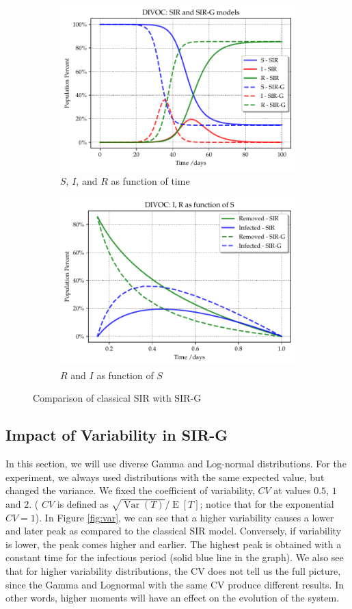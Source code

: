 \documentclass[USenglish,10pt]{article}
\DeclareMathOperator{\Exp}{E}       %
\newcommand{\E}[1]{\Exp\left[{#1}\right]}       %
\DeclareMathOperator{\Var}{Var}   %
\begin{document}
\begin{figure}
	\centering
	\begin{subfigure}{.45\textwidth}
		\includegraphics[width=.8\linewidth]{DIVOC-SIR-comp.pdf}
		\caption{$S$, $I$, and $R$ as function of time}
	\end{subfigure}
	\begin{subfigure}{.45\textwidth}
		\includegraphics[width=.8\linewidth]{DIVOC-IR-comp.pdf}
		\caption{$R$ and $I$ as function of $S$}
	\end{subfigure}
	\caption{Comparison of classical SIR with SIR-G}
	\label{fig:comp}
\end{figure}


\subsection{Impact of Variability in SIR-G}

In this section, we will use diverse Gamma and Log-normal distributions. For the experiment, we always used distributions with the same expected value, but changed the variance.
We fixed the coefficient of variability, $CV$ at values $0.5$, $1$ and $2$. ( $CV$ is defined as $\sqrt{\Var{(T)}}/\E{T}$; notice that for the exponential $CV=1$).
In Figure \ref{fig:var}, we can see that a higher variability causes a lower and later peak as compared to the classical SIR model.
Conversely, if variability is lower, the peak comes higher and earlier. The highest peak is obtained with a constant time for the infectious period (solid blue line in the graph).
We also see that for higher variability distributions, the CV does not tell us the full picture, since the Gamma and Lognormal with the same CV produce different results. In other words, higher moments will have an effect on the evolution of the system.
\end{document}
